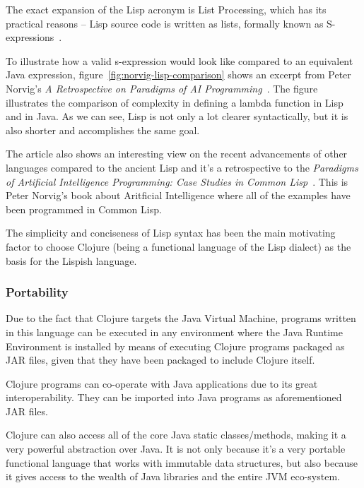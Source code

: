 The exact expansion of the Lisp acronym is List Processing, which has its practical reasons -- Lisp source code is written as lists, formally known as S-expressions~\cite{s-expression}\cite{s-expression-wiki}.

To illustrate how a valid s-expression would look like compared to an equivalent Java expression, figure~\ref{fig:norvig-lisp-comparison} shows an excerpt from Peter Norvig's \textit{A Retrospective on Paradigms of AI Programming}~\cite{retrospective.norvig}. The figure illustrates the comparison of complexity in defining a lambda function in Lisp and in Java. 
As we can see, Lisp is not only a lot clearer syntactically, but it is also shorter and accomplishes the same goal.  



The article also shows an interesting view on the recent advancements of other languages compared to the ancient Lisp and it's a retrospective to the \textit{Paradigms of Artificial Intelligence Programming: Case Studies in Common Lisp}~\cite{PAIP.Norvig}. This is Peter Norvig's book about Aritficial Intelligence where all of the examples have been programmed in Common Lisp.

The simplicity and conciseness of Lisp syntax has been the main motivating factor to choose Clojure (being a functional language of the Lisp dialect) as the basis for the Lispish language. 

\subsubsection{Portability}
Due to the fact that Clojure targets the Java Virtual Machine, programs written in this language can be executed in any environment where the Java Runtime Environment is installed by means of executing Clojure programs packaged as JAR files, given that they have been packaged to include Clojure itself.  

Clojure programs can co-operate with Java applications due to its great interoperability. They can be imported into Java programs as aforementioned JAR files.

Clojure can also access all of the core Java static classes/methods, making it a very powerful abstraction over Java. It is not only because it's a very portable functional language that works with immutable data structures, but also because it gives access to the wealth of Java libraries and the entire JVM eco-system.

